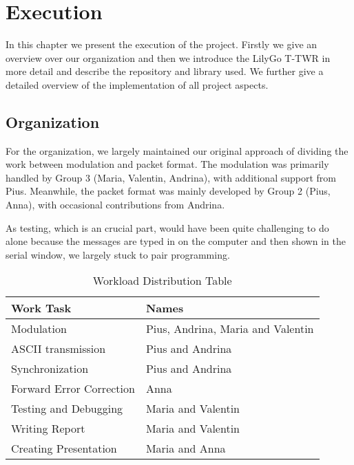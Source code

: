 \chapter{Execution}

In this chapter we present the execution of the project. Firstly we give an overview over our organization and then we introduce the LilyGo T-TWR in more detail and describe the repository and library used. We further give a detailed overview of the implementation of all project aspects.

\section{Organization}
For the organization, we largely maintained our original approach of dividing the work between modulation and packet format. The modulation was primarily handled by Group 3 (Maria, Valentin, Andrina), with additional support from Pius. Meanwhile, the packet format was mainly developed by Group 2 (Pius, Anna), with occasional contributions from Andrina.

As testing, which is an crucial part, would have been quite challenging to do alone because the messages are typed in on the computer and then shown in the serial window, we largely stuck to pair programming. 

\begin{table}[h]
    \centering
    \renewcommand{\arraystretch}{1.3} %
    \begin{tabular}{|p{7cm}|p{7cm}|}
        \hline
        \textbf{Work Task} & \textbf{Names} \\
        \hline
        Modulation & Pius, Andrina, Maria and Valentin \\
        \hline
        ASCII transmission  & Pius and Andrina \\
        \hline
        Synchronization  & Pius and Andrina \\
        \hline
        Forward Error Correction  & Anna \\
        \hline
        Testing and Debugging & Maria and Valentin \\
        \hline
        Writing Report & Maria and Valentin \\
        \hline
        Creating Presentation & Maria and Anna \\
        \hline
    \end{tabular}
    \caption{Workload Distribution Table}
    \label{tab:workload}
\end{table}


